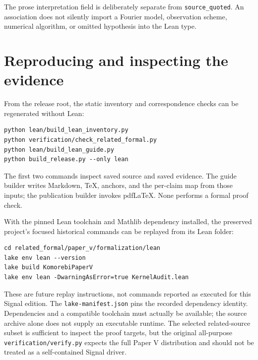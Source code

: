 \documentclass[11pt]{article}
\begin{document}
The prose interpretation field is deliberately separate from \texttt{source\_quoted}. An association does not silently import a Fourier model, observation scheme, numerical algorithm, or omitted hypothesis into the Lean type.

\hypertarget{reproducing-and-inspecting-the-evidence}{%
\section{Reproducing and inspecting the evidence}\label{reproducing-and-inspecting-the-evidence}}

From the release root, the static inventory and correspondence checks can be regenerated without Lean:

\begin{minipage}{\linewidth}
\begin{lstlisting}
python lean/build_lean_inventory.py
python verification/check_related_formal.py
python lean/build_lean_guide.py
python build_release.py --only lean
\end{lstlisting}
\end{minipage}\par

The first two commands inspect saved source and saved evidence. The guide builder writes Markdown, TeX, anchors, and the per-claim map from those inputs; the publication builder invokes pdfLaTeX. None performs a formal proof check.

With the pinned Lean toolchain and Mathlib dependency installed, the preserved project's focused historical commands can be replayed from its Lean folder:

\begin{minipage}{\linewidth}
\begin{lstlisting}
cd related_formal/paper_v/formalization/lean
lake env lean --version
lake build KomorebiPaperV
lake env lean -DwarningAsError=true KernelAudit.lean
\end{lstlisting}
\end{minipage}\par

These are future replay instructions, not commands reported as executed for this Signal edition. The \texttt{lake-manifest.json} pins the recorded dependency identity. Dependencies and a compatible toolchain must actually be available; the source archive alone does not supply an executable runtime. The selected related-source subset is sufficient to inspect the proof targets, but the original all-purpose \texttt{verification/verify.py} expects the full Paper V distribution and should not be treated as a self-contained Signal driver.
\end{document}
